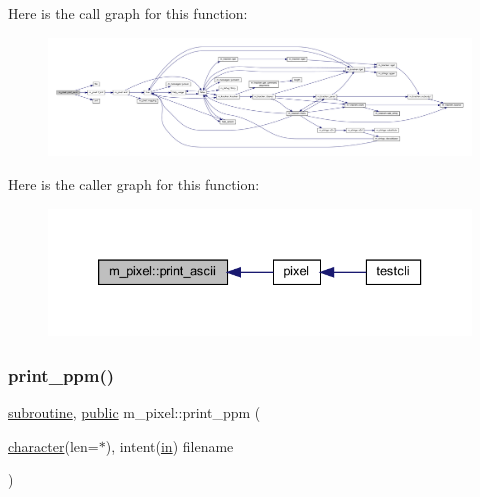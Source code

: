 Here is the call graph for this function\+:
\nopagebreak
\begin{figure}[H]
\begin{center}
\leavevmode
\includegraphics[width=350pt]{namespacem__pixel_ab2bb47aea567667b1b92c8265bcb36fb_cgraph}
\end{center}
\end{figure}
Here is the caller graph for this function\+:
\nopagebreak
\begin{figure}[H]
\begin{center}
\leavevmode
\includegraphics[width=333pt]{namespacem__pixel_ab2bb47aea567667b1b92c8265bcb36fb_icgraph}
\end{center}
\end{figure}
\mbox{\label{namespacem__pixel_a01797b04ce7c693c3fd6a841e8d1de48}} 
\subsubsection{\texorpdfstring{print\+\_\+ppm()}{print\_ppm()}}
{\footnotesize\ttfamily \hyperlink{M__stopwatch_83_8txt_acfbcff50169d691ff02d4a123ed70482}{subroutine}, \hyperlink{M__stopwatch_83_8txt_a2f74811300c361e53b430611a7d1769f}{public} m\+\_\+pixel\+::print\+\_\+ppm (\begin{DoxyParamCaption}\item[{\hyperlink{option__stopwatch_83_8txt_abd4b21fbbd175834027b5224bfe97e66}{character}(len=$\ast$), intent(\hyperlink{M__journal_83_8txt_afce72651d1eed785a2132bee863b2f38}{in})}]{filename }\end{DoxyParamCaption})}



